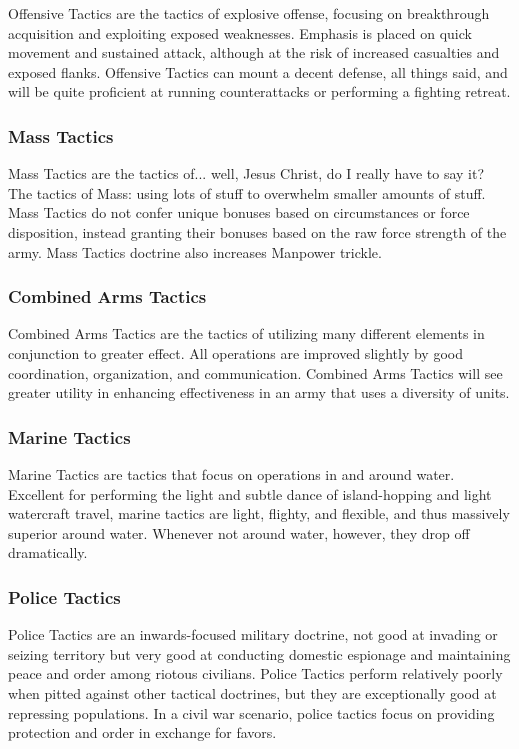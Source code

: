 \documentclass[11 pt]{scrartcl}
\begin{document}
Offensive Tactics are the tactics of explosive offense, focusing on breakthrough acquisition and exploiting exposed weaknesses. Emphasis is placed on quick movement and sustained attack, although at the risk of increased casualties and exposed flanks. Offensive Tactics can mount a decent defense, all things said, and will be quite proficient at running counterattacks or performing a fighting retreat.

\subsubsection*{Mass Tactics}

Mass Tactics are the tactics of... well, Jesus Christ, do I really have to say it? The tactics of Mass: using lots of stuff to overwhelm smaller amounts of stuff. Mass Tactics do not confer unique bonuses based on circumstances or force disposition, instead granting their bonuses based on the raw force strength of the army. Mass Tactics doctrine also increases Manpower trickle.

\subsubsection*{Combined Arms Tactics}

Combined Arms Tactics are the tactics of utilizing many different elements in conjunction to greater effect. All operations are improved slightly by good coordination, organization, and communication. Combined Arms Tactics will see greater utility in enhancing effectiveness in an army that uses a diversity of units.

\subsubsection*{Marine Tactics}

Marine Tactics are tactics that focus on operations in and around water. Excellent for performing the light and subtle dance of island-hopping and light watercraft travel, marine tactics are light, flighty, and flexible, and thus massively superior around water. Whenever not around water, however, they drop off dramatically.

\subsubsection*{Police Tactics}

Police Tactics are an inwards-focused military doctrine, not good at invading or seizing territory but very good at conducting domestic espionage and maintaining peace and order among riotous civilians. Police Tactics perform relatively poorly when pitted against other tactical doctrines, but they are exceptionally good at repressing populations. In a civil war scenario, police tactics focus on providing protection and order in exchange for favors.
\end{document}
